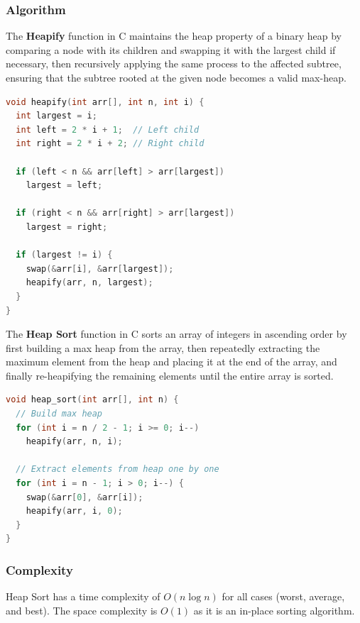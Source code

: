 \documentclass{article}
\begin{document}
\subsubsection{Algorithm}
The \textbf{Heapify} function in C maintains the heap property of a binary heap by comparing a node with its children and swapping it with the largest child if necessary, then recursively applying the same process to the affected subtree, ensuring that the subtree rooted at the given node becomes a valid max-heap.

\newpage
\begin{lstlisting}[language=C, caption=Heapify implementation]
void heapify(int arr[], int n, int i) {
  int largest = i;
  int left = 2 * i + 1;  // Left child
  int right = 2 * i + 2; // Right child

  if (left < n && arr[left] > arr[largest])
    largest = left;

  if (right < n && arr[right] > arr[largest])
    largest = right;

  if (largest != i) {
    swap(&arr[i], &arr[largest]);
    heapify(arr, n, largest);
  }
}
\end{lstlisting}

The \textbf{Heap Sort} function in C sorts an array of integers in ascending order by first building a max heap from the array, then repeatedly extracting the maximum element from the heap and placing it at the end of the array, and finally re-heapifying the remaining elements until the entire array is sorted.

\begin{lstlisting}[language=C, caption=Heap Sort implementation]
void heap_sort(int arr[], int n) {
  // Build max heap
  for (int i = n / 2 - 1; i >= 0; i--)
    heapify(arr, n, i);

  // Extract elements from heap one by one
  for (int i = n - 1; i > 0; i--) {
    swap(&arr[0], &arr[i]);
    heapify(arr, i, 0);
  }
}
\end{lstlisting}

\subsubsection{Complexity}
Heap Sort has a time complexity of $O(n \log n)$ for all cases (worst, average, and best). The space complexity is $O(1)$ as it is an in-place sorting algorithm.
\end{document}

